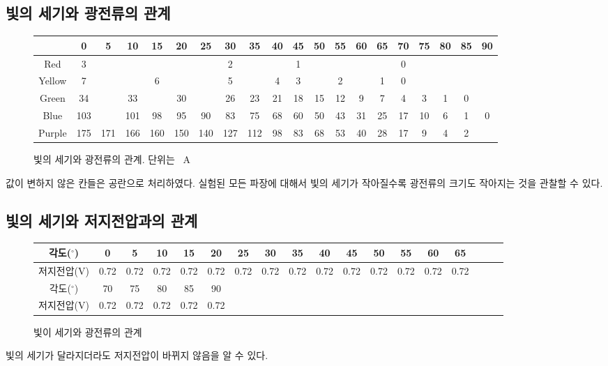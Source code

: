 \documentclass[a4paper]{article}
\begin{document}
	\subsection{빛의 세기와 광전류의 관계}
		\begin{figure}[h]
		\centering
			\begin{tabular}{|c|c|c|c|c|c|c|c|c|c|c|c|c|c|c|c|c|c|c|c|}
			\hline
			\diagbox{색깔}{각도($^{\circ}$)} & 0 & 5 & 10 & 15 & 20 & 25 & 30 & 35 & 40 & 45 & 50 & 55 & 60 & 65 & 70 & 75 & 80 & 85 & 90 \\
			\hline
			Red & 3 & & & & & & 2 & & & 1 & & & & & 0 & & & & \\
			\hline
			Yellow & 7 & & & 6 & & & 5 & & 4 & 3 & & 2 & & 1 & 0 & & & & \\
			\hline
			Green & 34 & & 33 & & 30 & & 26 & 23 & 21 & 18 & 15 & 12 & 9 & 7 & 4 & 3 & 1 & 0 & \\
			\hline
			Blue & 103 & & 101 & 98 & 95 & 90 & 83 & 75 & 68 & 60 & 50 & 43 & 31 &25 & 17 & 10 & 6 & 1& 0 \\
			\hline 
			Purple & 175 & 171 & 166 & 160 & 150 & 140 & 127 & 112 & 98 & 83 & 68 & 53 & 40 & 28 & 17 & 9 & 4 & 2 \\
			\hline
		\end{tabular}
		\caption{빛의 세기와 광전류의 관계. 단위는 \si{\mu A}}
	\end{figure}
	값이 변하지 않은 칸들은 공란으로 처리하였다. 
	실험된 모든 파장에 대해서 빛의 세기가 작아질수록 광전류의 크기도 작아지는 것을 관찰할 수 있다.

	\subsection{빛의 세기와 저지전압과의 관계}
		\begin{figure}[h]
			\begin{tabular}{|c|c|c|c|c|c|c|c|c|c|c|c|c|c|c|c|c|c|}
			\hline
			각도($^{\circ}$) & 0 & 5 & 10 & 15 & 20 & 25 & 30 & 35 & 40 & 45 & 50 & 55 & 60 & 65 \\
			\hline
			저지전압(\si{V}) & 0.72 & 0.72 & 0.72 & 0.72 & 0.72 & 0.72 & 0.72 & 0.72 & 0.72 & 0.72 & 0.72 & 0.72 & 0.72 & 0.72 \\
			\hline
			각도($^{\circ}$) & 70 & 75 & 80 & 85 & 90 \\
			\hline
			저지전압(\si{V}) & 0.72 & 0.72 & 0.72 & 0.72 & 0.72 \\	
			\hline
			\end{tabular}
			\caption{빛이 세기와 광전류의 관계}
		\end{figure}
		빛의 세기가 달라지더라도 저지전압이 바뀌지 않음을 알 수 있다.
\end{document}
